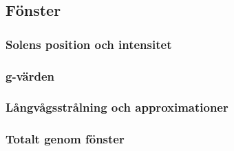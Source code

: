 \subsection{Fönster}

\subsubsection{Solens position och intensitet}
\frame{
}

\subsubsection{g-värden}
\frame{
}

\subsubsection{Långvågsstrålning och approximationer}
\frame{
}

\subsubsection{Totalt genom fönster}
\frame{
}
